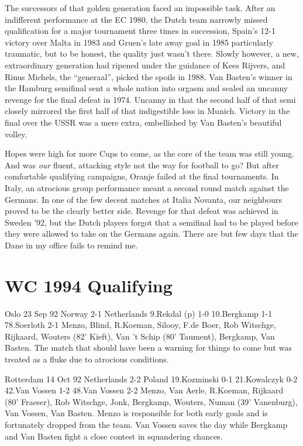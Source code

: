The successors of that golden generation faced an impossible task. After an 
indifferent performance at the EC 1980, the Dutch team narrowly missed 
qualification for a major tournament three times in succession, Spain's 12-1
victory over Malta in 1983 and Gruen's late away goal in 1985 particularly 
traumatic, but to be honest, the quality just wasn't there. Slowly however, a 
new, extraordinary generation had ripened under the guidance of Kees Rijvers, 
and Rinus Michels, the ``generaal'', picked the spoils in 1988.  Van Basten's 
winner in the Hamburg semifinal sent a whole nation into orgasm and sealed an 
uncanny revenge for the final defeat in 1974.  Uncanny in that the second half
of that semi closely mirrored the first half of that indigestible loss in 
Munich. Victory in the final over the USSR was a mere extra, embellished by Van
Basten's beautiful volley.

Hopes were high for more Cups to come, as the core of the team was still young.
And was \textit{our} fluent, attacking style not the way for football to go?  But after
comfortable qualifying campaigns, Oranje failed at the final tournaments.  In 
Italy, an atrocious group performance meant a second round match against the 
Germans.  In one of the few decent matches at Italia Novanta, our neighbours 
proved to be the clearly better side.  Revenge for that defeat was achieved in 
Sweden '92, but the Dutch players forgot that a semifinal had to be played 
before they were allowed to take on the Germans again.  There are but few days
that the Dane in my office fails to remind me.
\section{WC 1994 Qualifying}
Oslo 23 Sep 92        Norway      2-1 Netherlands
        9.Rekdal (p) 1-0 10.Bergkamp 1-1 78.Soerloth 2-1
     Menzo, Blind, R.Koeman, Silooy, F.de Boer, Rob Witschge, Rijkaard,
     Wouters (82' Kieft), Van 't Schip (80' Taument), Bergkamp, Van Basten.
The match that should have been a warning for things to come but was treated
 as a fluke due to atrocious conditions.

Rotterdam    14 Oct 92        Netherlands 2-2 Poland
        19.Kozminski 0-1 21.Kowalczyk 0-2 42.Van Vossen 1-2 48.Van Vossen 2-2
    Menzo, Van Aerle, R.Koeman, Rijkaard (80' Fraeser), Rob Witschge, Jonk,
     Bergkamp, Wouters, Numan (39' Vanenburg), Van Vossen, Van Basten.
Menzo is responsible for both early goals and is fortunately dropped from the
 team.  Van Vossen saves the day while Bergkamp and Van Basten fight a close
 contest in squandering chances.

